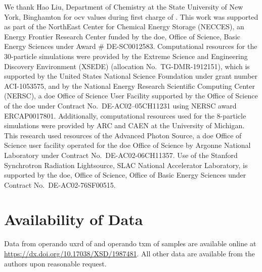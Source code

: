 \documentclass{WileyMSP-template}
\begin{document}
We thank Hao Liu, Department of Chemistry at the State University of
New York, Binghamton for \gls{ocv} values during first charge of
\nca{}. This work was supported as part of the NorthEast Center for
Chemical Energy Storage (NECCES), an Energy Frontier Research Center
funded by the \gls{doe}, Office of Science, Basic Energy Sciences
under Award \# DE-SC0012583. Computational resources for the
30-particle simulations were provided by the Extreme Science and
Engineering Discovery Environment (XSEDE) (allocation
No.\ TG-DMR-1912151)\cite{wilkins-diehr2014}, which is supported by
the United States National Science Foundation under grant number
ACI-1053575, and by the National Energy Research Scientific Computing
Center (NERSC), a \gls{doe} Office of Science User Facility supported
by the Office of Science of the \gls{doe} under Contract
No.\ DE-AC02–05CH11231 using NERSC award ERCAP0017801. Additionally,
computational resources used for the 8-particle simulations were
provided by ARC and CAEN at the University of Michigan.  This research
used resources of the Advanced Photon Source, a \gls{doe} Office of
Science user facility operated for the \gls{doe} Office of Science by
Argonne National Laboratory under Contract No.\ DE-AC02-06CH11357. Use
of the Stanford Synchrotron Radiation Lightsource, SLAC National
Accelerator Laboratory, is supported by the \gls{doe}, Office of
Science, Office of Basic Energy Sciences under Contract
No.\ DE-AC02-76SF00515.

\section*{Availability of Data}

Data from operando \gls{uxrd} of \nca{} and operando \gls{txm} of
\nmc{} samples are available online at
\url{https://dx.doi.org/10.17038/XSD/1987481}. All other data are
available from the authors upon reasonable request.


\newpage




\newpage
\end{document}
